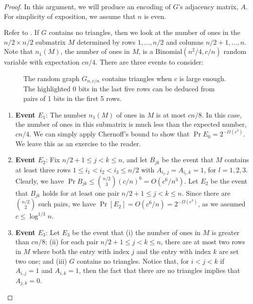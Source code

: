 \documentclass[format=acmsmall, review=false, screen=true]{acmart}
\begin{document}
\begin{proof}
  In this argument, we will produce an encoding of $G$'s adjacency
  matrix, $A$. For simplicity of exposition, we assume that $n$ is
  even.

  Refer to .  If $G$ contains no triangles, then we
  look at the number of ones in the $n/2\times n/2$ submatrix $M$
  determined by rows $1,\ldots,n/2$ and columns $n/2+1,\ldots,n$. Note
  that $n_1(M)$, the number of ones in $M$, is a
  $\mathrm{Binomial}(n^2/4, c/n)$ random variable with expectation
  $cn/4$.  There are three
  events to consider:
  
  \begin{figure}
    \caption{The random graph $G_{n,c/n}$ contains triangles when $c$
      is large enough.  The highlighted 0 bits in the last five rows
      can be deduced from pairs of 1 bits in the first 5 rows.}
  \end{figure}

  \begin{enumerate}
  \item \textbf{Event $E_1$}: The number $n_1(M)$ of ones in $M$ is at most 
     $cn/8$.  In this case,
    the number of ones in this submatrix is much less than the
    expected number, $cn/4$.  
    We can simply apply
    Chernoff's bound to show that $\Pr E_0 = 2^{-\varOmega(c^3)}$.
    We leave this as an exercise to the reader.

  \item \textbf{Event $E_2$}:
    Fix $n/2 + 1 \leq j <  k \leq n$, and let $B_{jk}$ be the event that
    $M$ contains at least three rows $1 \leq i_1 < i_2 < i_{3}
    \leq n/2$ with $A_{i_l, j} = A_{i_l, k} = 1$, for $l = 1, 2, 3$.
    Clearly, we have $\Pr B_{jk} \leq \binom{n/2}{3} (c/n)^{6}
    = O\left(c^{6}/n^{3}\right)$. Let $E_2$ be the event that
    $B_{jk}$ holds for at least one pair $n/2+1 \leq j < k \leq n$.
    Since there are $\binom{n/2}{2}$ such pairs, we have
    $\Pr[E_2] = O(c^{6}/n) = 2^{-\varOmega(c^3)}$, as we
    assumed $c \leq \log^{1/3} n$.
  \item \textbf{Event $E_3$}: Let $E_3$ be the event that (i) 
  the number of ones in $M$ 
   is greater than $cn/8$; (ii)  for each pair $n/2+1 \leq j < k \leq n$,
   there are at most two rows in $M$ where both the entry with
   index $j$ and the entry with index $k$ are set two one; and (iii) $G$
   contains no triangles.
    Notice that, for $i<j<k$ if $A_{i,j}=1$ and $A_{i,k}=1$, then the
    fact that there are no triangles implies that $A_{j,k}=0$.


\end{enumerate}
\end{proof}
\end{document}
